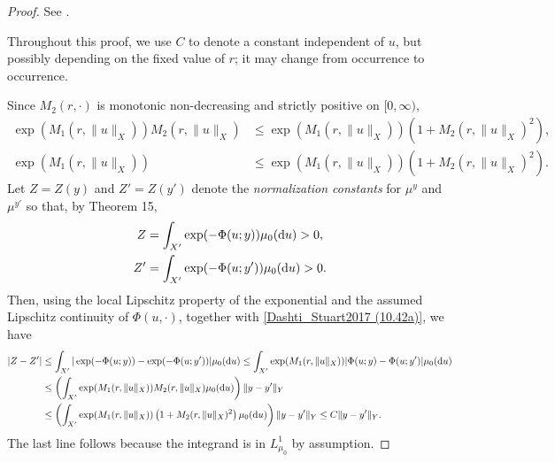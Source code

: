 \documentclass[oneside,11pt]{book}
\numberwithin{equation}{section}
\begin{document}
\begin{proof}
    See \cite[pp. 352--354]{Dashti_Stuart2017}.
    
    Throughout this proof, we use $C$ to denote a constant independent of $u$, but possibly depending on the fixed value of $r$; it may change from occurrence to occurrence.
    
    Since $M_2(r,\cdot)$ is monotonic non-decreasing and strictly positive on $[0,\infty)$,
    \begin{align}
        \label{Dashti_Stuart2017 (10.42a)}
        \exp(M_1(r,\|u\|_X))M_2(r,\|u\|_X)&\le\exp(M_1(r,\|u\|_X))\left(1 + M_2(r,\|u\|_X)^2\right),\\
        \label{Dashti_Stuart2017 (10.42b)}
        \exp(M_1(r,\|u\|_X))&\le\exp(M_1(r,\|u\|_X))\left(1 + M_2(r,\|u\|_X)^2\right).
    \end{align}
    Let $Z = Z(y)$ and $Z' = Z(y')$ denote the \textit{normalization constants} for $\mu^y$ and $\mu^{y'}$ so that, by Theorem 15,
    \begin{align*}
        Z &= \int_{X'} \exp(-\Phi(u;y))\mu_0({\rm d}u) > 0,\\
        Z' &= \int_{X'} \exp(-\Phi(u;y'))\mu_0({\rm d}u) > 0.
    \end{align*}
    Then, using the local Lipschitz property of the exponential and the assumed Lipschitz continuity of $\Phi(u,\cdot)$, together with \eqref{Dashti_Stuart2017 (10.42a)}, we have
    \begin{align*}
        |Z - Z'|&\le\int_{X'} |\exp(-\Phi(u;y)) - \exp(-\Phi(u;y'))|\mu_0({\rm d}u)\le\int_{X'} \exp(M_1(r,\|u\|_X))|\Phi(u;y) - \Phi(u;y')|\mu_0({\rm d}u)\\
        &\le\left(\int_{X'} \exp(M_1(r,\|u\|_X))M_2(r,\|u\|_X)\mu_0({\rm d}u)\right)\|y - y'\|_Y\\
        &\le\left(\int_{X'} \exp(M_1(r,\|u\|_X))\left(1 + M_2(r,\|u\|_X)^2\right)\mu_0({\rm d}u)\right)\|y - y'\|_Y\le C\|y - y'\|_Y.
    \end{align*}
    The last line follows because the integrand is in $L_{\mu_0}^1$ by assumption.
    

\end{proof}
\end{document}
